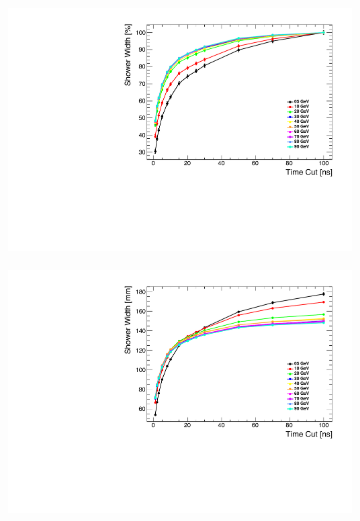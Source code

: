 \begin{figure}[t]
  \centering
  \begin{minipage}{.45\textwidth}
    \begin{subfigure}[t]{0.7\textwidth}
      \centering
      \includegraphics[width=1\linewidth]{chap6/fig_TimingILD/NoSmearing/ShowerWidth_TimeCuts_noSmearing}
      \caption{} \label{fig:ShowerWidthNoSmearing}
    \end{subfigure}
    \begin{subfigure}[t]{0.7\textwidth}
      \centering
      \includegraphics[width=1\linewidth]{chap6/fig_TimingILD/NoSmearing/ShowerWidthAbso_TimeCuts_noSmearing}
      \caption{} \label{fig:ShowerWidthAbsoNoSmearing}
    \end{subfigure}
  \end{minipage}

\end{figure}
